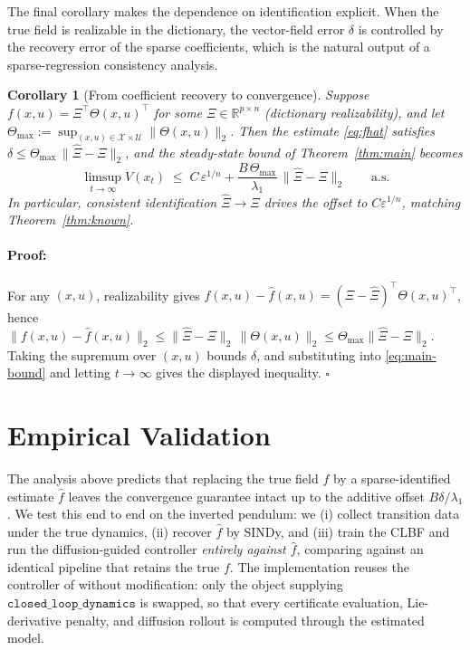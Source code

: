 \documentclass{article}
\newenvironment{proof}{\paragraph{Proof:}}{\hfill$\square$}
\newcommand{\R}{\mathbb{R}}
\newcommand{\eps}{\varepsilon}
\newcommand{\hf}{\hat{f}}
\newcommand{\Dict}{\Theta}
\newtheorem{corollary}[theorem]{Corollary}
\begin{document}
The final corollary makes the dependence on identification explicit. When the
true field is realizable in the dictionary, the vector-field error $\delta$ is
controlled by the recovery error of the sparse coefficients, which is the natural
output of a sparse-regression consistency analysis.

\begin{corollary}[From coefficient recovery to convergence]
\label{cor:coeff}
Suppose $f(x,u)=\Xi^\top\Dict(x,u)^\top$ for some $\Xi\in\R^{p\times n}$ (dictionary
realizability), and let
$\Dict_{\max}:=\sup_{(x,u)\in\mathcal{X}\times\mathcal{U}}\|\Dict(x,u)\|_2$. Then the
estimate \eqref{eq:fhat} satisfies
$\delta\le \Dict_{\max}\,\|\hat\Xi-\Xi\|_2$, and the steady-state bound of
Theorem~\ref{thm:main} becomes
\[
    \limsup_{t\to\infty} V(x_t)\;\le\; C\,\eps^{1/n}+\frac{B\,\Dict_{\max}}{\lambda_1}\,\|\hat\Xi-\Xi\|_2
    \qquad \text{a.s.}
\]
In particular, consistent identification $\hat\Xi\to\Xi$ drives the offset to
$C\eps^{1/n}$, matching Theorem~\ref{thm:known}.
\end{corollary}

\begin{proof}
For any $(x,u)$, realizability gives
$f(x,u)-\hf(x,u)=(\Xi-\hat\Xi)^\top\Dict(x,u)^\top$, hence
$\|f(x,u)-\hf(x,u)\|_2\le\|\hat\Xi-\Xi\|_2\,\|\Dict(x,u)\|_2\le\Dict_{\max}\|\hat\Xi-\Xi\|_2$.
Taking the supremum over $(x,u)$ bounds $\delta$, and substituting into
\eqref{eq:main-bound} and letting $t\to\infty$ gives the displayed inequality.
\end{proof}

\section{Empirical Validation}
\label{sec:experiments}

The analysis above predicts that replacing the true field $f$ by a
sparse-identified estimate $\hf$ leaves the convergence guarantee intact up to the
additive offset $B\delta/\lambda_1$. We test this end to end on the inverted
pendulum: we (i) collect transition data under the true dynamics, (ii) recover
$\hf$ by SINDy, and (iii) train the CLBF and run the diffusion-guided controller
\emph{entirely against $\hf$}, comparing against an identical pipeline that retains
the true $f$. The implementation reuses the controller of \citet{cheng2026safe}
without modification: only the object supplying $\mathtt{closed\_loop\_dynamics}$
is swapped, so that every certificate evaluation, Lie-derivative penalty, and
diffusion rollout is computed through the estimated model.
\end{document}
